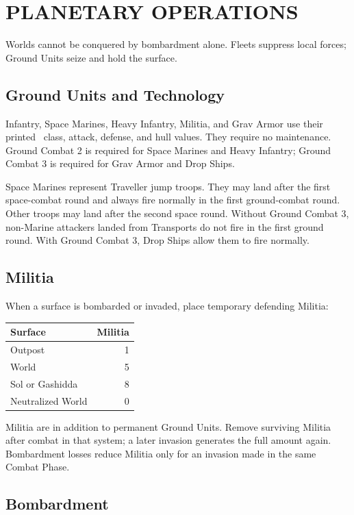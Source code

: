\section{PLANETARY OPERATIONS}

Worlds cannot be conquered by bombardment alone. Fleets suppress local forces;
Ground Units seize and hold the surface.

\subsection{Ground Units and Technology}

Infantry, Space Marines, Heavy Infantry, Militia, and Grav Armor use their
printed \CloseEncounters\ class, attack, defense, and hull values. They require
no maintenance. Ground Combat 2 is required for Space Marines and Heavy
Infantry; Ground Combat 3 is required for Grav Armor and Drop Ships.

Space Marines represent Traveller jump troops. They may land after the first
space-combat round and always fire normally in the first ground-combat round.
Other troops may land after the second space round. Without Ground Combat 3,
non-Marine attackers landed from Transports do not fire in the first ground
round. With Ground Combat 3, Drop Ships allow them to fire normally.

\subsection{Militia}

When a surface is bombarded or invaded, place temporary defending Militia:

\begin{tabularx}{\columnwidth}{@{}Xr@{}}
\toprule
Surface & Militia \\
\midrule
Outpost & 1 \\
World & 5 \\
Sol or Gashidda & 8 \\
Neutralized World & 0 \\
\bottomrule
\end{tabularx}

Militia are in addition to permanent Ground Units. Remove surviving Militia
after combat in that system; a later invasion generates the full amount again.
Bombardment losses reduce Militia only for an invasion made in the same Combat
Phase.

\subsection{Bombardment}

